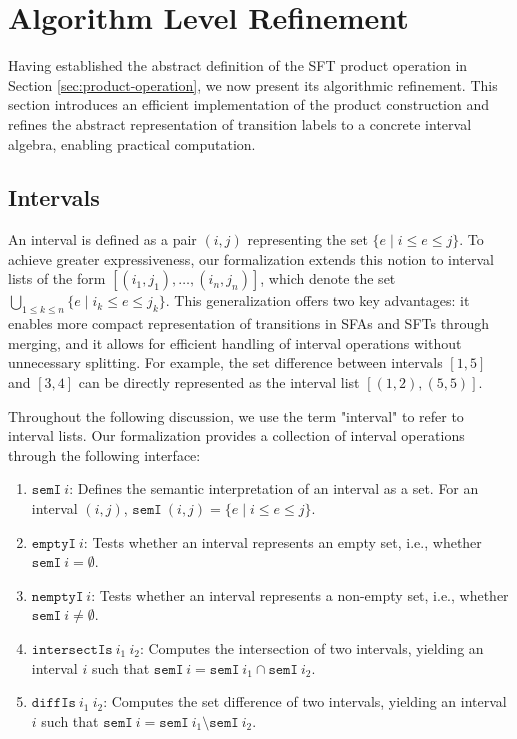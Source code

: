 \documentclass[a4paper,UKenglish,cleveref, autoref, anonymous, thm-restate]{lipics-v2021}
\begin{document}
\section{Algorithm Level Refinement}
\label{sec_alg_refinement}
Having established the abstract definition of the SFT product operation in Section \ref{sec:product-operation}, we now present its algorithmic refinement. This section introduces an efficient implementation of the product construction and refines the abstract representation of transition labels to a concrete interval algebra, enabling practical computation.


\subsection{Intervals}

An interval is defined as a pair $(i, j)$ representing the set $\{e \mid i \leq e \leq j\}$. To achieve greater expressiveness, our formalization extends this notion to interval lists of the form $[(i_1, j_1), \ldots, (i_n, j_n)]$, which denote the set $\bigcup_{1\leq k\leq n}\{e \mid i_k \leq e \leq j_k\}$. This generalization offers two key advantages: it enables more compact representation of transitions in SFAs and SFTs through merging, and it allows for efficient handling of interval operations without unnecessary splitting. For example, the set difference between intervals $[1, 5]$ and $[3, 4]$ can be directly represented as the interval list $[(1, 2), (5, 5)]$.


Throughout the following discussion, we use the term "interval" to refer to interval lists. Our formalization provides a collection of interval operations through the following interface:

\begin{enumerate}
  \item $\texttt{semI}~i$: Defines the semantic interpretation of an interval as a set. For an interval $(i,j)$, $\texttt{semI}~(i,j) = \{e \mid i \leq e \leq j\}$.
  \item $\texttt{emptyI}~i$: Tests whether an interval represents an empty set, i.e., whether $\texttt{semI}~i = \emptyset$.
  \item $\texttt{nemptyI}~i$: Tests whether an interval represents a non-empty set, i.e., whether $\texttt{semI}~i \neq \emptyset$.
  \item $\texttt{intersectIs}~i_1~i_2$: Computes the intersection of two intervals, yielding an interval $i$ such that $\texttt{semI}~i = \texttt{semI}~i_1 \cap \texttt{semI}~i_2$.
  \item $\texttt{diffIs}~i_1~i_2$: Computes the set difference of two intervals, yielding an interval $i$ such that $\texttt{semI}~i = \texttt{semI}~i_1 \setminus \texttt{semI}~i_2$.
\end{enumerate}
\end{document}
